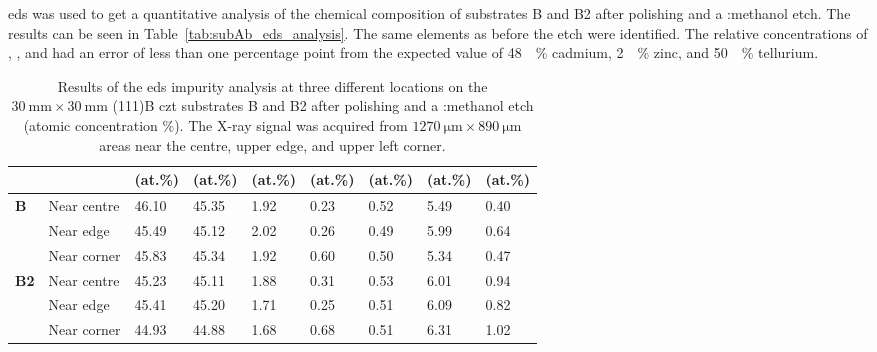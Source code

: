 \Ac{eds} was used to get a quantitative analysis of the chemical composition of substrates B and B2 after polishing and a :methanol etch. The results can be seen in Table~\ref{tab:subAb_eds_analysis}. The same elements as before the etch were identified. The relative concentrations of , , and  had an error of less than one percentage point from the expected value of \SI{48}{\atomic\percent} cadmium, \SI{2}{\atomic\percent} zinc, and \SI{50}{\atomic\percent} tellurium. 

\begin{table}[htbp]
    \centering
    \caption[\Ac{eds} impurity analysis of substrate B with surface pre-growth preparation.]{Results of the \ac{eds} impurity analysis at three different locations on the $\SI{30}{\milli\metre}\times\SI{30}{\milli\metre}$ (111)B \ac{czt} substrates B and B2 after polishing and a :methanol etch (atomic concentration \%). The X-ray signal was acquired from $\SI{1270}{\micro\metre}\times\SI{890}{\micro\metre}$ areas near the centre, upper edge, and upper left corner.}\label{tab:subBb_eds_analysis}
    \begin{tabu} to 1.0\textwidth { X[0.5,l] X[1.85,r] X[1.125,c] X[1.125,c] X[1.125,c] X[1.125,c] X[1.125,c] X[1.125,c] X[1.125,c] }
    \hline
         & & \textbf{} (at.\%) & \textbf{} (at.\%) & \textbf{} (at.\%) & \textbf{ } (at.\%) & \textbf{} (at.\%) & \textbf{} (at.\%) & \textbf{} (at.\%) \\
        \hline
        \textbf{B} &Near centre  & \SI{46.10}{} & \SI{45.35}{} & \SI{1.92}{} & \SI{0.23}{} & \SI{0.52}{} & \SI{5.49}{} & \SI{0.40}{} \\ %
        &Near edge & \SI{45.49}{} & \SI{45.12}{} & \SI{2.02}{} & \SI{0.26}{} & \SI{0.49}{} & \SI{5.99}{} & \SI{0.64}{} \\ %
        &Near corner & \SI{45.83}{} & \SI{45.34}{} & \SI{1.92}{} & \SI{0.60}{} & \SI{0.50}{} & \SI{5.34}{} & \SI{0.47}{} \\ %
        \hline
        \textbf{B2} &Near centre  & \SI{45.23}{} & \SI{45.11}{} & \SI{1.88}{} & \SI{0.31}{} & \SI{0.53}{} & \SI{6.01}{} & \SI{0.94}{} \\ %
        &Near edge & \SI{45.41}{} & \SI{45.20}{} & \SI{1.71}{} & \SI{0.25}{} & \SI{0.51}{} & \SI{6.09}{} & \SI{0.82}{} \\ %
        &Near corner & \SI{44.93}{} & \SI{44.88}{} & \SI{1.68}{} & \SI{0.68}{} & \SI{0.51}{} & \SI{6.31}{} & \SI{1.02}{} \\ %
         \hline
    \end{tabu}
\end{table}


